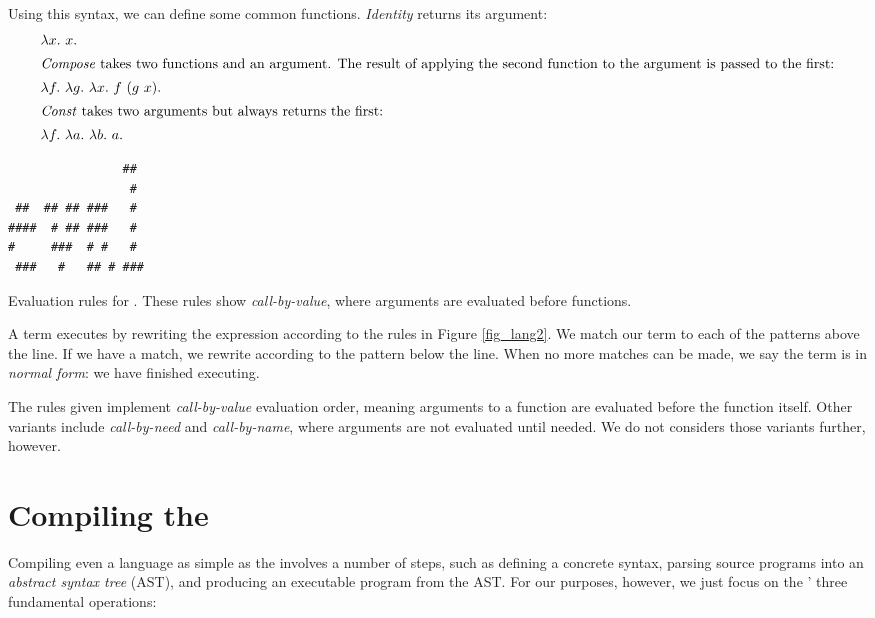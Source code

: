 \documentclass[12pt]{report}
\begin{document}
Using this syntax, we can define some common functions. \emph{Identity} 
returns its argument:
\begin{align}
  & \lambda x.\ x. \\
\intertext{\emph{Compose} takes two functions and an argument. The result of
applying the second function to the argument is passed to the first:}
  & \lambda f.\ \lambda g.\ \lambda x.\ f\ (g\ x). \\
\intertext{\emph{Const} takes two arguments but always returns the first:}
  & \lambda f.\ \lambda a.\ \lambda b.\ a.
\end{align}

\begin{myfig}[bt]
\begin{minipage}{2in}
\begin{Verbatim}
                ##  
                 #  
 ##  ## ## ###   #  
####  # ## ###   #  
#     ###  # #   #  
 ###   #   ## # ### 
\end{Verbatim}
\end{minipage}
  \caption{Evaluation rules for \lamA. These rules show 
    \emph{call-by-value}, where arguments are evaluated
    before functions.}
  \label{fig_lang2}
\end{myfig}

A \lamA term executes by rewriting the expression according to the
rules in Figure \ref{fig_lang2}. We match our term to each of the
patterns above the line. If we have a match, we rewrite according to
the pattern below the line. When no more matches can be made, we say
the term is in \emph{normal form}: we have finished executing.

The rules given implement \emph{call-by-value} evaluation order,
meaning arguments to a function are evaluated before the function
itself. Other variants include \emph{call-by-need} and
\emph{call-by-name}, where arguments are not evaluated until
needed. We do not considers those variants further, however.

\section{Compiling the \LamA}
\label{sec_lang1}

Compiling even a language as simple as the \lamA involves a number of
steps, such as defining a concrete syntax, parsing source programs
into an \emph{abstract syntax tree} (AST), and producing an executable
program from the AST. For our purposes, however, we just focus on the
\lamA' three fundamental operations:
\end{document}

